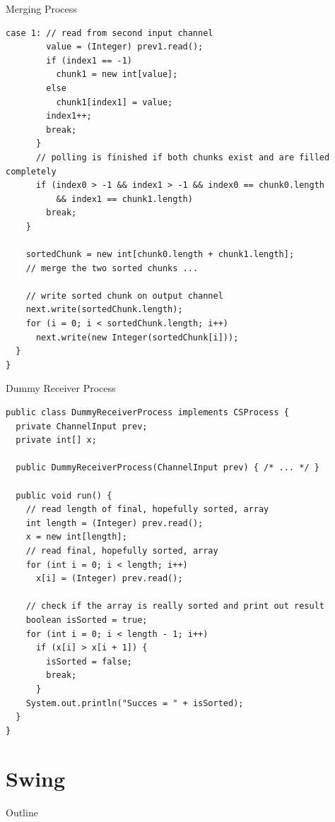 \begin{frame}[fragile]{Merging Process}
\begin{lstlisting}[basicstyle=\fontsize{7}{9}\selectfont\ttfamily]
      case 1: // read from second input channel
        value = (Integer) prev1.read();
        if (index1 == -1)
          chunk1 = new int[value];
        else
          chunk1[index1] = value;
        index1++;
        break;
      }
      // polling is finished if both chunks exist and are filled completely
      if (index0 > -1 && index1 > -1 && index0 == chunk0.length
          && index1 == chunk1.length)
        break;
    }

    sortedChunk = new int[chunk0.length + chunk1.length];
    // merge the two sorted chunks ...

    // write sorted chunk on output channel
    next.write(sortedChunk.length);
    for (i = 0; i < sortedChunk.length; i++)
      next.write(new Integer(sortedChunk[i]));
  }
}
\end{lstlisting}
\end{frame}

\begin{frame}[fragile]{Dummy Receiver Process}
\begin{lstlisting}[basicstyle=\fontsize{7}{9}\selectfont\ttfamily]
public class DummyReceiverProcess implements CSProcess {
  private ChannelInput prev;
  private int[] x;

  public DummyReceiverProcess(ChannelInput prev) { /* ... */ }

  public void run() {
    // read length of final, hopefully sorted, array
    int length = (Integer) prev.read();
    x = new int[length];
    // read final, hopefully sorted, array
    for (int i = 0; i < length; i++)
      x[i] = (Integer) prev.read();

    // check if the array is really sorted and print out result
    boolean isSorted = true;
    for (int i = 0; i < length - 1; i++)
      if (x[i] > x[i + 1]) {
        isSorted = false;
        break;
      }
    System.out.println("Succes = " + isSorted);
  }
}
\end{lstlisting}
\end{frame}


\section{Swing}

\begin{frame}{Outline}
  \tableofcontents[current]
\end{frame}

